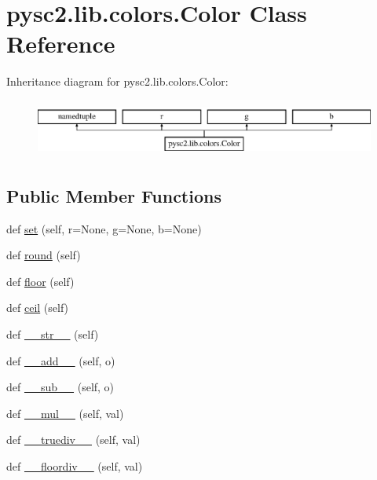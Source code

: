 \hypertarget{classpysc2_1_1lib_1_1colors_1_1_color}{}\section{pysc2.\+lib.\+colors.\+Color Class Reference}
\label{classpysc2_1_1lib_1_1colors_1_1_color}
Inheritance diagram for pysc2.\+lib.\+colors.\+Color\+:\begin{figure}[H]
\begin{center}
\leavevmode
\includegraphics[height=1.931034cm]{classpysc2_1_1lib_1_1colors_1_1_color}
\end{center}
\end{figure}
\subsection*{Public Member Functions}
\begin{DoxyCompactItemize}
\item 
def \mbox{\hyperlink{classpysc2_1_1lib_1_1colors_1_1_color_a4f85933c31b5eee882ee02bc276c2910}{set}} (self, r=None, g=None, b=None)
\item 
def \mbox{\hyperlink{classpysc2_1_1lib_1_1colors_1_1_color_a38a169169ccba8887056f2411b48919a}{round}} (self)
\item 
def \mbox{\hyperlink{classpysc2_1_1lib_1_1colors_1_1_color_a1d574e03aa1e9eaedbd7693efcd96c49}{floor}} (self)
\item 
def \mbox{\hyperlink{classpysc2_1_1lib_1_1colors_1_1_color_aa0516d088a354d745b86a855c972d8ba}{ceil}} (self)
\item 
def \mbox{\hyperlink{classpysc2_1_1lib_1_1colors_1_1_color_ad3c3b8cc2e506b1d2aaedc50aae52016}{\+\_\+\+\_\+str\+\_\+\+\_\+}} (self)
\item 
def \mbox{\hyperlink{classpysc2_1_1lib_1_1colors_1_1_color_af1b1d0a84bcc91484781007d63e6113b}{\+\_\+\+\_\+add\+\_\+\+\_\+}} (self, o)
\item 
def \mbox{\hyperlink{classpysc2_1_1lib_1_1colors_1_1_color_af38ed2fff40bacddd1dd02d9676f7486}{\+\_\+\+\_\+sub\+\_\+\+\_\+}} (self, o)
\item 
def \mbox{\hyperlink{classpysc2_1_1lib_1_1colors_1_1_color_a4cc27cb2b3f1f2be14e671f0def6c9da}{\+\_\+\+\_\+mul\+\_\+\+\_\+}} (self, val)
\item 
def \mbox{\hyperlink{classpysc2_1_1lib_1_1colors_1_1_color_a232910e9fbb61b4ed2a71c70223be937}{\+\_\+\+\_\+truediv\+\_\+\+\_\+}} (self, val)
\item 
def \mbox{\hyperlink{classpysc2_1_1lib_1_1colors_1_1_color_a1b8de342848c1a509ea27131ce6aedc3}{\+\_\+\+\_\+floordiv\+\_\+\+\_\+}} (self, val)
\end{DoxyCompactItemize}



